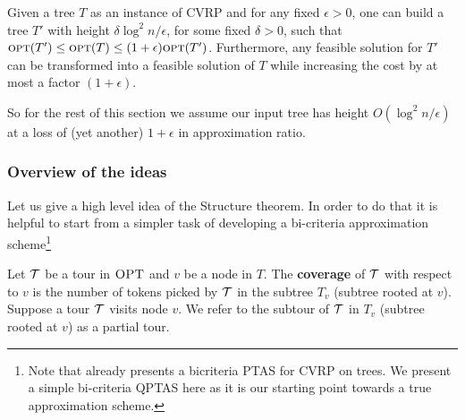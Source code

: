 \documentclass[twoside,leqno]{article}
\newcommand{\calT}{{\cal T}}
\newcommand{\opt}{\mbox{\sc opt}}
\newcommand{\OPT}{\mbox{\sc OPT}}
\newcommand{\eps}{\epsilon}
\begin{document}
\begin{theorem}\label{thm:height-red}
Given a tree $T$ as an instance of CVRP and for any fixed $\epsilon>0$, one can build a tree $T'$ with height $\delta\log^2 n/\epsilon$, for some fixed $\delta>0$, such that $\opt(T')\leq \opt(T)\leq (1+\epsilon)\opt(T')$. Furthermore, any feasible solution for $T'$ can be transformed into a feasible solution of $T$ while increasing the cost by at most a factor $(1+\epsilon)$.
\end{theorem}

So for the rest of this section we assume our input tree has height $O(\log^2 n/\eps)$ at a loss of (yet another) $1+\eps$ in 
approximation ratio.

\subsubsection{Overview of the ideas}
Let us give a high level idea of the Structure theorem. In order to do that it is helpful to start from a simpler task of developing a bi-criteria approximation scheme\footnote{Note that \cite{Becker-Paul-Bricriteria} already presents a bicriteria PTAS for CVRP on trees.
We present a simple bi-criteria QPTAS here as it is our starting point towards a true approximation scheme.}


Let $\calT$ be a tour in $\OPT$ and $v$ be a node in $T$. The \textbf{coverage} of $\calT$ with respect to $v$ is the number of tokens picked by $\calT$ in the subtree $T_v$ (subtree rooted at $v$).
Suppose a tour $\calT$ visits node $v$. We refer to the subtour of $\calT$ in $T_v$ (subtree rooted at $v$) as a partial tour.

\end{document}
